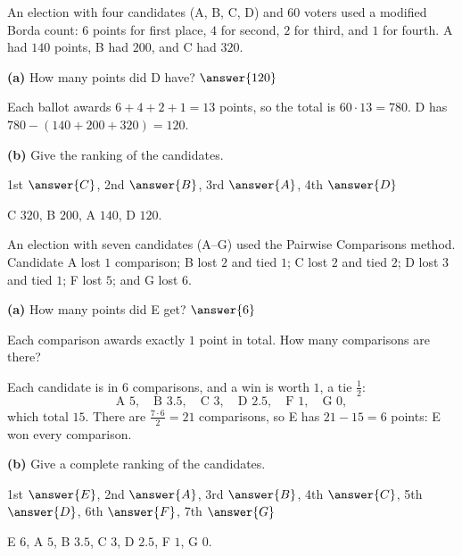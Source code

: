 \documentclass[12pt]{ximera}
\begin{document}
\begin{problem}
An election with four candidates (A, B, C, D) and $60$ voters used a modified Borda
count: $6$ points for first place, $4$ for second, $2$ for third, and $1$ for fourth. A
had $140$ points, B had $200$, and C had $320$.

\begin{prompt}
\textbf{(a)} How many points did D have? $\answer{120}$

\begin{feedback}
Each ballot awards $6+4+2+1=13$ points, so the total is $60\cdot13=780$. D has
$780-(140+200+320)=120$.
\end{feedback}
\end{prompt}

\begin{prompt}
\textbf{(b)} Give the ranking of the candidates.

1st $\answer{C}$, 2nd $\answer{B}$, 3rd $\answer{A}$, 4th $\answer{D}$

\begin{feedback}
C $320$, B $200$, A $140$, D $120$.
\end{feedback}
\end{prompt}
\end{problem}

\begin{problem}
An election with seven candidates (A--G) used the Pairwise Comparisons method. Candidate
A lost $1$ comparison; B lost $2$ and tied $1$; C lost $2$ and tied $2$; D lost $3$ and
tied $1$; F lost $5$; and G lost $6$.

\begin{prompt}
\textbf{(a)} How many points did E get? $\answer{6}$

\begin{hint}
Each comparison awards exactly $1$ point in total. How many comparisons are there?
\end{hint}

\begin{feedback}
Each candidate is in $6$ comparisons, and a win is worth $1$, a tie $\frac12$:
\[
\text{A } 5,\quad \text{B } 3.5,\quad \text{C } 3,\quad \text{D } 2.5,\quad
\text{F } 1,\quad \text{G } 0,
\]
which total $15$. There are $\frac{7\cdot6}{2}=21$ comparisons, so E has
$21-15=6$ points: E won every comparison.
\end{feedback}
\end{prompt}

\begin{prompt}
\textbf{(b)} Give a complete ranking of the candidates.

1st $\answer{E}$, 2nd $\answer{A}$, 3rd $\answer{B}$, 4th $\answer{C}$, 5th $\answer{D}$,
6th $\answer{F}$, 7th $\answer{G}$

\begin{feedback}
E $6$, A $5$, B $3.5$, C $3$, D $2.5$, F $1$, G $0$.
\end{feedback}
\end{prompt}
\end{problem}
\end{document}
